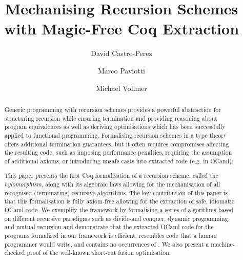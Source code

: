 \documentclass[ a4paper, UKenglish, cleveref, autoref, thm-restate]{lipics-v2021}
\title{Mechanising Recursion Schemes with Magic-Free Coq Extraction}
\author{David Castro-Perez}{School of Computing, University of Kent}{d-castro-perez@kent.ac.uk}{}{}
\author{Marco Paviotti}{School of Computing, University of Kent}{m.paviotti@kent.ac.uk}{}{}
\author{Michael Vollmer}{School of Computing, University of Kent}{m.vollmer@kent.ac.uk}{}{}
\begin{document}
\maketitle

\begin{abstract}
  Generic programming with recursion schemes provides a powerful abstraction for
structuring recursion while ensuring termination and providing reasoning about
program equivalences as well as deriving optimisations which has been
successfully applied to functional programming. Formalising recursion schemes in
a type theory offers additional termination guarantees, but it often requires
compromises affecting the resulting code, such as imposing performance
penalties, requiring the assumption of additional axioms, or introducing unsafe
casts into extracted code (e.g.  in OCaml).

This paper presents the first Coq formalisation of a recursion scheme, called
the \emph{hylomorphism}, along with its algebraic laws allowing for the
mechanisation of all recognised (terminating) recursive algorithms. The key
contribution of this paper is that this formalisation is fully axiom-free
allowing for the extraction of safe, idiomatic OCaml code. We exemplify the
framework by formalising a series of algorithms based on different recursive
paradigms such as divide-and conquer, dynamic programming, and mutual recursion
and demonstrate that the extracted OCaml code for the programs formalised in our
framework is efficient, resembles code that a human programmer would write, and
contains no occurrences of .  We also present a machine-checked
proof of the well-known short-cut fusion optimisation.
\end{abstract}
\end{document}
